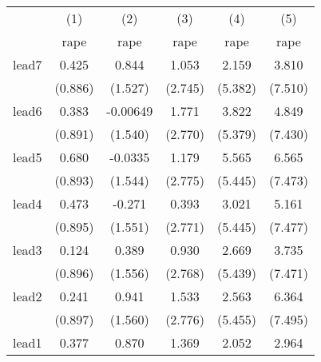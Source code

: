 {
\def\sym#1{\ifmmode^{#1}\else\(^{#1}\)\fi}
\begin{tabular}{l*{5}{c}}
\hline\hline
            &\multicolumn{1}{c}{(1)}&\multicolumn{1}{c}{(2)}&\multicolumn{1}{c}{(3)}&\multicolumn{1}{c}{(4)}&\multicolumn{1}{c}{(5)}\\
            &\multicolumn{1}{c}{rape}&\multicolumn{1}{c}{rape}&\multicolumn{1}{c}{rape}&\multicolumn{1}{c}{rape}&\multicolumn{1}{c}{rape}\\
\hline
lead7       &       0.425         &       0.844         &       1.053         &       2.159         &       3.810         \\
            &     (0.886)         &     (1.527)         &     (2.745)         &     (5.382)         &     (7.510)         \\
[1em]
lead6       &       0.383         &    -0.00649         &       1.771         &       3.822         &       4.849         \\
            &     (0.891)         &     (1.540)         &     (2.770)         &     (5.379)         &     (7.430)         \\
[1em]
lead5       &       0.680         &     -0.0335         &       1.179         &       5.565         &       6.565         \\
            &     (0.893)         &     (1.544)         &     (2.775)         &     (5.445)         &     (7.473)         \\
[1em]
lead4       &       0.473         &      -0.271         &       0.393         &       3.021         &       5.161         \\
            &     (0.895)         &     (1.551)         &     (2.771)         &     (5.445)         &     (7.477)         \\
[1em]
lead3       &       0.124         &       0.389         &       0.930         &       2.669         &       3.735         \\
            &     (0.896)         &     (1.556)         &     (2.768)         &     (5.439)         &     (7.471)         \\
[1em]
lead2       &       0.241         &       0.941         &       1.533         &       2.563         &       6.364         \\
            &     (0.897)         &     (1.560)         &     (2.776)         &     (5.455)         &     (7.495)         \\
[1em]
lead1       &       0.377         &       0.870         &       1.369         &       2.052         &       2.964         \\

\end{tabular}}
